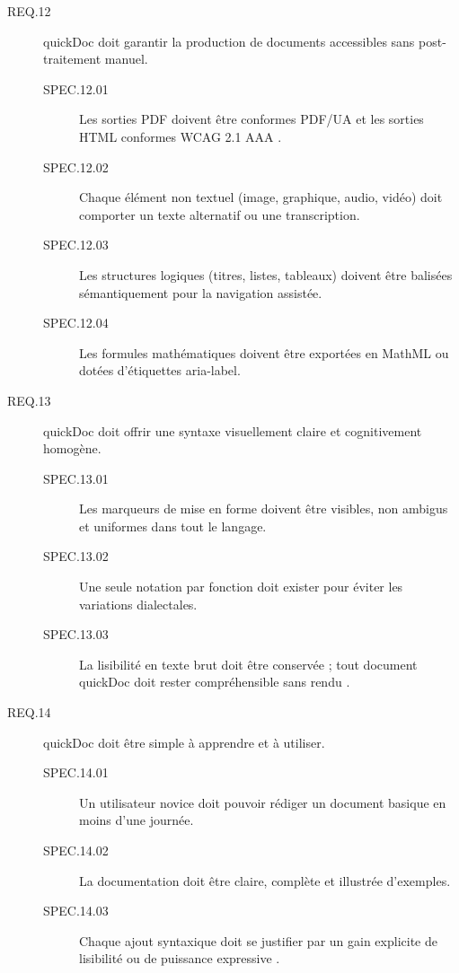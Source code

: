 \documentclass[a4paper,12pt]{article}
\begin{document}
\begin{description}
\item[{\label{orgde7733a}REQ.12}] quickDoc doit garantir la production de documents accessibles sans post-traitement manuel.
\begin{description}
\item[{\label{org3129292}SPEC.12.01}] Les sorties PDF doivent être conformes PDF/UA et les sorties HTML conformes WCAG 2.1 AAA \autocite{LaTeXAccessibilityGuide2024,jasonc.whiteUsingMarkupLanguages2022}.
\item[{\label{orgc1c0347}SPEC.12.02}] Chaque élément non textuel (image, graphique, audio, vidéo) doit comporter un texte alternatif ou une transcription.
\item[{\label{org7e5de03}SPEC.12.03}] Les structures logiques (titres, listes, tableaux) doivent être balisées sémantiquement pour la navigation assistée.
\item[{\label{org32c6f07}SPEC.12.04}] Les formules mathématiques doivent être exportées en MathML ou dotées d’étiquettes aria-label.
\end{description}

\item[{\label{org0c186ab}REQ.13}] quickDoc doit offrir une syntaxe visuellement claire et cognitivement homogène.
\begin{description}
\item[{\label{org15f965d}SPEC.13.01}] Les marqueurs de mise en forme doivent être visibles, non ambigus et uniformes dans tout le langage.
\item[{\label{orgc4563e7}SPEC.13.02}] Une seule notation par fonction doit exister pour éviter les variations dialectales.
\item[{\label{org502185c}SPEC.13.03}] La lisibilité en texte brut doit être conservée ; tout document quickDoc doit rester compréhensible sans rendu \autocite{allenAsciiDocWritersGuide,ducasseMicrodownCleanExtensible2020}.
\end{description}

\item[{\label{org509b18a}REQ.14}] quickDoc doit être simple à apprendre et à utiliser.
\begin{description}
\item[{\label{org9176ff7}SPEC.14.01}] Un utilisateur novice doit pouvoir rédiger un document basique en moins d’une journée.
\item[{\label{orge54fd48}SPEC.14.02}] La documentation doit être claire, complète et illustrée d’exemples.
\item[{\label{org2bd50dd}SPEC.14.03}] Chaque ajout syntaxique doit se justifier par un gain explicite de lisibilité ou de puissance expressive \autocite{liuHowReadMeFiles2022,markushofbauerLargeScaleCollaborativeWriting2023}.
\end{description}


\end{description}
\end{document}
